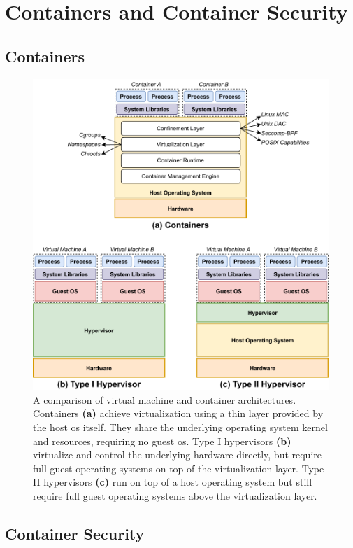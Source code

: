 \section{Containers and Container Security}%
\label{s:container-security-bg}

\subsection{Containers}%
\label{ss:containers-bg}

\begin{figure}[tbp]
  \centering
  \includegraphics[width=0.8\linewidth]{figs/background/virtualization.pdf}
  \caption[A comparison of virtual machine and container architectures]{
    A comparison of virtual machine and container architectures. Containers \textbf{(a)}
    achieve virtualization using a thin layer provided by the host \gls{os}
    itself. They share the underlying operating system kernel and resources, requiring no
    guest \gls{os}. Type I hypervisors \textbf{(b)} virtualize and control the
    underlying hardware directly, but require full guest operating systems on top of the
    virtualization layer. Type II hypervisors \textbf{(c)} run on top of a host operating
    system but still require full guest operating systems above the virtualization layer.
  }%
  \label{fig:virt}
\end{figure}

\subsection{Container Security}%
\label{ss:container-security-bg}







